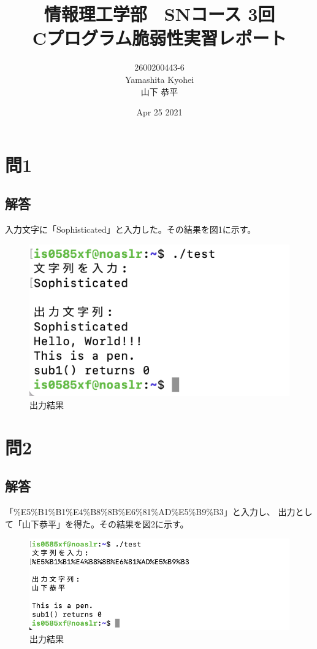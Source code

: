 \documentclass[dvipdfmx,autodetect-engine,titlepage]{jsarticle}
\title{情報理工学部　SNコース 3回\\
Cプログラム脆弱性実習レポート\\}
\author{2600200443-6\\Yamashita Kyohei\\山下 恭平}
\date{Apr 25 2021}
\begin{document}
\maketitle

\section{問1}

\subsection{解答}

入力文字に「Sophisticated」と入力した。その結果を図1に示す。

\begin{figure}[h]
  \centering
  \includegraphics[scale=1]{pic1.png}
  \caption{出力結果}
\end{figure}

\section{問2}

\subsection{解答}

「\%E5\%B1\%B1\%E4\%B8\%8B\%E6\%81\%AD\%E5\%B9\%B3」と入力し、
出力として「山下恭平」を得た。その結果を図2に示す。

\begin{figure}[h]
  \centering
  \includegraphics[scale=1]{pic2.png}
  \caption{出力結果}
\end{figure}
\end{document}
